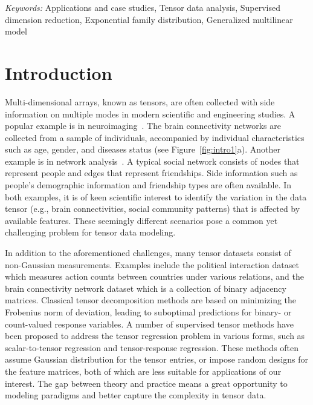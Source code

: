 \documentclass[12pt]{article}
\theoremstyle{definition}
\theoremstyle{definition}
\begin{document}
\noindent%
{\it Keywords:}  Applications and case studies, Tensor data analysis, Supervised dimension reduction, Exponential family distribution, Generalized multilinear model
\vfill

\newpage
{} %
\section{Introduction}
\label{sec:intro}

Multi-dimensional arrays, known as tensors, are often collected with side information on multiple modes in modern scientific and engineering studies. A popular example is in neuroimaging~\citep{zhou2013tensor}. The brain connectivity networks are collected from a sample of individuals, accompanied by individual characteristics such as age, gender, and diseases status (see Figure~\ref{fig:intro1}a). Another example is in network analysis~\citep{pmlr-v108-berthet20a,hoff2005bilinear}. A typical social network consists of nodes that represent people and edges that represent  friendships. Side information such as people’s demographic information and friendship types are often available. In both examples, it is of keen scientific interest to identify the variation in the data tensor (e.g., brain connectivities, social community patterns) that is affected by available features. These seemingly different scenarios pose a common yet challenging problem for tensor data modeling. 

In addition to the aforementioned challenges, many tensor datasets consist of non-Gaussian measurements. Examples include the political interaction dataset \citep{nickel2011three} which measures action counts between countries under various relations, and the brain connectivity network dataset \citep{zhang2018mapping} which is a collection of binary adjacency matrices. Classical tensor decomposition methods are based on minimizing the Frobenius norm of deviation, leading to suboptimal predictions for binary- or count-valued response variables. A number of supervised tensor methods have been proposed \citep{narita2012tensor, zhao2012higher, yu2016learning,lock2018supervised} to address the tensor regression problem in various forms, such as scalar-to-tensor regression and tensor-response regression. These methods often assume Gaussian distribution for the tensor entries, or impose random designs for the feature matrices, both of which are less suitable for applications of our interest. The gap between theory and practice means a great opportunity to modeling paradigms and better capture the complexity in tensor data. 
\end{document}
